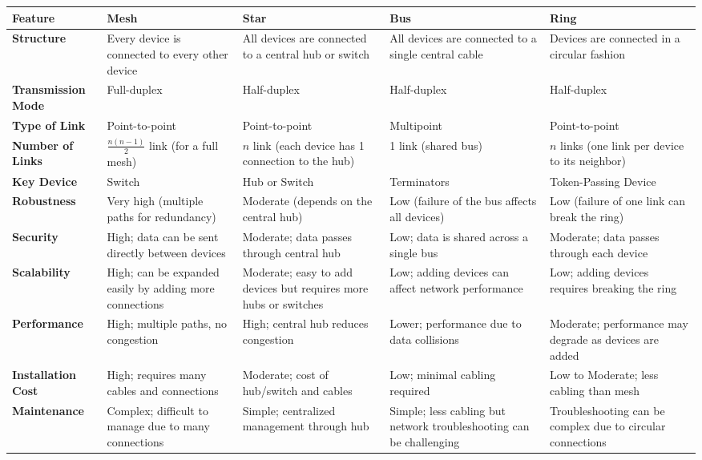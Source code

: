 \begin{tabularx}{\textwidth}{|p{2.5cm}|L|L|L|L|}
   \hline
   \textbf{Feature} & \textbf{Mesh} & \textbf{Star} & \textbf{Bus} & \textbf{Ring} \\
   \hline
   \textbf{Structure} & Every device is connected to every other device & All devices are connected to a central hub or switch & All devices are connected to a single central cable & Devices are connected in a circular fashion \\
   \hline
   \textbf{Transmission Mode} & Full-duplex & Half-duplex & Half-duplex & Half-duplex \\\hline
   \textbf{Type of Link} & Point-to-point & Point-to-point & Multipoint & Point-to-point \\\hline
   \textbf{Number of Links} & $\frac{n(n-1)}{2}$ link \newline (for a full mesh) & $n$ link (each device has 1 connection to the hub) & 1 link (shared bus) & $n$ links (one link per device to its neighbor) \\\hline
   \textbf{Key Device} & Switch & Hub or Switch & Terminators & Token-Passing Device \\\hline

   \textbf{Robustness} &
   Very high (multiple paths for redundancy) &
   Moderate (depends on the central hub) &
   Low (failure of the bus affects all devices) &
   Low (failure of one link can break the ring) \\\hline

   \textbf{Security} &
   High; data can be sent directly between devices &
   Moderate; data passes through central hub &
   Low; data is shared across a single bus &
   Moderate; data passes through each device 
   \\\hline

   \textbf{Scalability} & High; can be expanded easily by adding more connections & Moderate; easy to add devices but requires more hubs or switches & Low; adding devices can affect network performance & Low; adding devices requires breaking the ring \\
   \hline
   \textbf{Performance} & High; multiple paths, no congestion & High; central hub reduces congestion & Lower; performance due to data collisions & Moderate; performance may degrade as devices are added \\
   \hline
   \textbf{Installation Cost} & High; requires many cables and connections & Moderate; cost of hub/switch and cables & Low; minimal cabling required & Low to Moderate; less cabling than mesh \\
   \hline
   \textbf{Maintenance} & Complex; difficult to manage due to many connections & Simple; centralized management through hub & Simple; less cabling but network troubleshooting can be challenging & Troubleshooting can be complex due to circular connections \\
   \hline
\end{tabularx}

